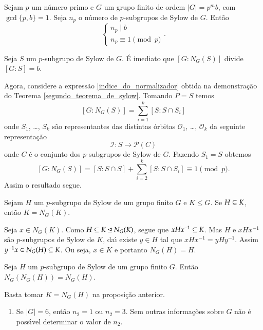 \begin{teorema}\label{terceiro_teorema_de_sylow}
	Sejam $p$ um n\'umero primo e $G$ um grupo finito de ordem $|G| = p^mb$, com $\gcd\{p, b\} = 1$. Seja $n_p$ o n\'umero de $p$-subgrupos de Sylow de $G$. Ent\~ao
	\[
		\begin{cases}
			n_p \mid b\\
			n_p \equiv 1 \pmod p
		\end{cases}.
	\]
\end{teorema}
\begin{prova}
	Seja $S$ um $p$-subgrupo de Sylow de $G$. \'E imediato que $[G : N_G(S)]$ divide $[G : S] = b$.

	Agora, considere a express\~ao \eqref{indice_do_normalizador} obtida na demonstra\c{c}\~ao do Teorema \ref{segundo_teorema_de_sylow}. Tomando $P = S$ temos
	\[
		[G : N_G(S)] = \sum_{i = 1}^k[S : S \cap S_i]
	\]
	onde $S_1$, \dots, $S_k$ s\~ao representantes das distintas \'orbitas $\mathcal{O}_1$, \dots, $\mathcal{O}_k$ da seguinte representa\c{c}\~ao
	\[
		\mathcal{I} : S \to \mathcal{P}(C)
	\]
	onde $C$ \'e o conjunto dos $p$-subgrupos de Sylow de $G$. Fazendo $S_1 = S$ obtemos
	\[
		[G : N_G(S)] = [S : S \cap S] + \sum_{i = 2}^k[S : S \cap S_i] \equiv 1 \pmod p.
	\]
	Assim o resultado segue.
\end{prova}

\begin{proposicao}
	Sejam $H$ um $p$-subgrupo de Sylow de um grupo finito $G$ e $K \le G$. Se $H \subseteq K$, ent\~ao $K = N_G(K)$.
\end{proposicao}
\begin{prova}
	Seja $x \in N_G(K)$. Como $H \subseteq K \unlhd N_G(K)$, segue que $xHx^{-1} \subseteq K$. Mas $H$ e $xHx^{-1}$ s\~ao $p$-subgrupos de Sylow de $K$, da{\'\i} existe $y \in H$ tal que $xHx^{-1} = yHy^{-1}$. Assim $y^{-1}x \in N_G(H) \subseteq K$. Ou seja, $x \in K$ e portanto $N_G(H) = H$.
\end{prova}

\begin{corolario}
	Seja $H$ um $p$-subgrupo de Sylow de um grupo finito $G$. Ent\~ao $N_G(N_G(H)) = N_G(H)$.
\end{corolario}
\begin{prova}
	Basta tomar $K = N_G(H)$ na proposi\c{c}\~ao anterior.
\end{prova}

\begin{exemplos}
	\begin{enumerate}
		\item Se $|G| = 6$, ent\~ao $n_2 = 1$ ou $n_2 = 3$. Sem outras informa\c{c}\~oes sobre $G$ n\~ao \'e poss{\'\i}vel determinar o valor de $n_2$.
	\end{enumerate}
\end{exemplos}



